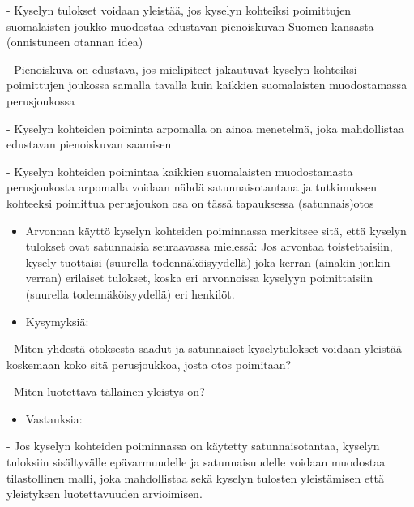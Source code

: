 \documentclass[
]{book}
\providecommand{\tightlist}{%
  \setlength{\itemsep}{0pt}\setlength{\parskip}{0pt}}
\begin{document}
\begin{itemize}
\begin{itemize}
\begin{itemize}
\begin{itemize}

- Kyselyn tulokset voidaan yleistää, jos kyselyn kohteiksi poimittujen suomalaisten joukko muodostaa edustavan pienoiskuvan Suomen kansasta (onnistuneen otannan idea)

- Pienoiskuva on edustava, jos mielipiteet jakautuvat kyselyn kohteiksi poimittujen joukossa samalla tavalla kuin kaikkien suomalaisten muodostamassa perusjoukossa

- Kyselyn kohteiden poiminta arpomalla on ainoa menetelmä, joka mahdollistaa edustavan pienoiskuvan saamisen

- Kyselyn kohteiden poimintaa kaikkien suomalaisten muodostamasta perusjoukosta arpomalla voidaan nähdä satunnaisotantana ja tutkimuksen kohteeksi poimittua perusjoukon osa on tässä tapauksessa (satunnais)otos

\end{itemize}

\begin{itemize}
\item
  Arvonnan käyttö kyselyn kohteiden poiminnassa merkitsee sitä, että kyselyn tulokset ovat satunnaisia seuraavassa mielessä: Jos arvontaa toistettaisiin, kysely tuottaisi (suurella todennäköisyydellä) joka kerran (ainakin jonkin verran) erilaiset tulokset, koska eri arvonnoissa kyselyyn poimittaisiin (suurella todennäköisyydellä) eri henkilöt.
\item
  Kysymyksiä:
\end{itemize}

\begin{itemize}

- Miten yhdestä otoksesta saadut ja satunnaiset kyselytulokset voidaan yleistää koskemaan koko sitä perusjoukkoa, josta otos poimitaan?

- Miten luotettava tällainen yleistys on?

\end{itemize}

\begin{itemize}
\tightlist
\item
  Vastauksia:
\end{itemize}

\begin{itemize}

- Jos kyselyn kohteiden poiminnassa on käytetty satunnaisotantaa, kyselyn tuloksiin sisältyvälle epävarmuudelle ja satunnaisuudelle voidaan muodostaa tilastollinen malli, joka mahdollistaa sekä kyselyn tulosten yleistämisen että yleistyksen luotettavuuden arvioimisen.


\end{itemize}
\end{itemize}
\end{itemize}
\end{itemize}
\end{document}
